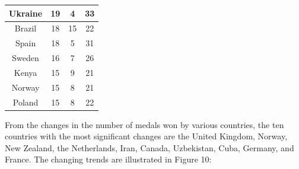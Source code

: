\documentclass{mcmthesis}
\begin{document}
\begin{table}
\begin{tabular}{|c|ccc|}
\hline
\rowcolor[rgb]{1,0.824,0.635} {\cellcolor[rgb]{0.992,0.737,0.529}}Ukraine                                        & 19                                                              & 4                                       & 33                                       \\ 
\hline
{\cellcolor[rgb]{0.992,0.737,0.529}}Brazil                                                                       & 18                                                              & 15                                      & 22                                       \\ 
\hline
\rowcolor[rgb]{1,0.824,0.635} {\cellcolor[rgb]{0.992,0.737,0.529}}Spain                                          & 18                                                              & 5                                       & 31                                       \\ 
\hline
{\cellcolor[rgb]{0.992,0.737,0.529}}Sweden                                                                       & 16                                                              & 7                                       & 26                                       \\ 
\hline
\rowcolor[rgb]{1,0.824,0.635} {\cellcolor[rgb]{0.992,0.737,0.529}}Kenya                                          & 15                                                              & 9                                       & 21                                       \\ 
\hline
{\cellcolor[rgb]{0.992,0.737,0.529}}Norway                                                                       & 15                                                              & 8                                       & 21                                       \\ 
\hline
\rowcolor[rgb]{1,0.824,0.635} {\cellcolor[rgb]{0.992,0.737,0.529}}Poland                                         & 15                                                              & 8                                       & 22                                       \\
\hline
\end{tabular}
\end{table}

From the changes in the number of medals won by various countries, the ten countries with the most significant changes are the United Kingdom, Norway, New Zealand, the Netherlands, Iran, Canada, Uzbekistan, Cuba, Germany, and France. The changing trends are illustrated in Figure 10:
\end{document}
